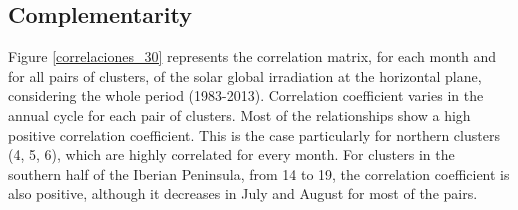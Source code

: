 \begin{subappendices}



\subsection{Complementarity}


Figure \ref{correlaciones_30} represents the correlation matrix, for each month and for all pairs of clusters, of the solar global irradiation at the horizontal plane, considering the whole period (1983-2013). Correlation coefficient varies in the annual cycle for each pair of clusters. Most of the relationships show a high positive correlation coefficient. This is the case particularly for northern clusters (4, 5, 6), which are highly correlated for every month. For clusters in the southern half of the Iberian Peninsula, from 14 to 19, the correlation coefficient is also positive, although it decreases in July and August for most of the pairs. 


\end{subappendices}

